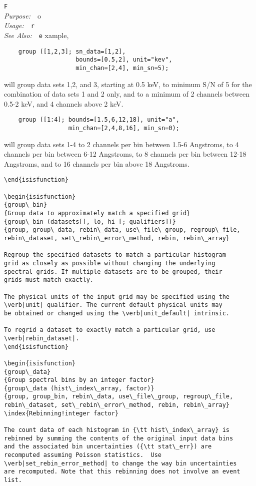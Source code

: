 \documentclass{book}
\makeatletter
\newif\ifpdf
\newenvironment{isisfunction}[4]%
{\index{{#1}@{\tt #1}}%
  \ifpdf
  \else
     \addcontentsline{toc}{subsection}{{#1} -- {#2}}
  \fi
  \vbox{
          \vspace*{\baselineskip}
          {\LARGE\tt #1}\vspace*{\baselineskip}\\
          {{\it Purpose:}~~{#2}}\\
          {{\it Usage:}~~{\tt #3}}\\
          {{\it See Also:}~~{\tt #4}}
       }
}%
{ }
\makeatother
\begin{document}
{\begin{isisfunction}
For example,
\begin{verbatim}
    group ([1,2,3]; sn_data=[1,2],
                    bounds=[0.5,2], unit="kev",
                    min_chan=[2,4], min_sn=5);
\end{verbatim}
will group data sets 1,2, and 3, starting at 0.5 keV, to minimum S/N of
5 for the combination of data sets 1 and 2 only, and to a minimum of 2
channels between 0.5-2 keV, and 4 channels above 2 keV.
\begin{verbatim}
    group ([1:4]; bounds=[1.5,6,12,18], unit="a",
                  min_chan=[2,4,8,16], min_sn=0);
\end{verbatim}
will group data sets 1-4 to 2 channels per bin between 1.5-6
Angstroms, to 4 channels per bin between 6-12 Angstroms, to 8
channels per bin between 12-18 Angstroms, and to 16 channels
per bin above 18 Angstroms.
\begin{verbatim}
\end{isisfunction}

\begin{isisfunction}
{group\_bin}
{Group data to approximately match a specified grid}
{group\_bin (datasets[], lo, hi [; qualifiers])}
{group, group\_data, rebin\_data, use\_file\_group, regroup\_file, rebin\_dataset, set\_rebin\_error\_method, rebin, rebin\_array}

Regroup the specified datasets to match a particular histogram
grid as closely as possible without changing the underlying
spectral grids. If multiple datasets are to be grouped, their
grids must match exactly.

The physical units of the input grid may be specified using the
\verb|unit| qualifier. The current default physical units may
be obtained or changed using the \verb|unit_default| intrinsic.

To regrid a dataset to exactly match a particular grid, use
\verb|rebin_dataset|.
\end{isisfunction}

\begin{isisfunction}
{group\_data}
{Group spectral bins by an integer factor}
{group\_data (hist\_index\_array, factor)}
{group, group_bin, rebin\_data, use\_file\_group, regroup\_file, rebin\_dataset, set\_rebin\_error\_method, rebin, rebin\_array}
\index{Rebinning!integer factor}

The count data of each histogram in {\tt hist\_index\_array} is
rebinned by summing the contents of the original input data bins
and the associated bin uncertainties ({\tt stat\_err}) are
recomputed assuming Poisson statistics.  Use
\verb|set_rebin_error_method| to change the way bin uncertainties
are recomputed. Note that this rebinning does not involve an event
list.


\end{verbatim}
\end{isisfunction}}
\end{document}
